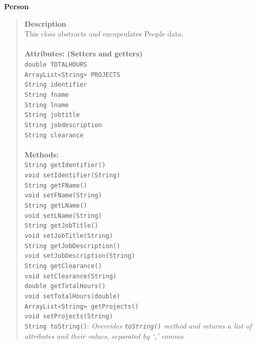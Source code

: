 \documentclass[12pt]{article}
\begin{document}
{\bf Person}
\begin{quote}
{\bf Description}\\
This class abstracts and encapsulates People data.\\\\
{\bf Attributes: (Setters and getters)}\\
\texttt{double TOTALHOURS}\\
\texttt{ArrayList<String> PROJECTS}\\
\texttt{String identifier}\\
\texttt{String fname}\\
\texttt{String lname}\\
\texttt{String jobtitle}\\
\texttt{String jobdescription}\\
\texttt{String clearance}\\\\
{\bf Methods:}\\
\texttt{String getIdentifier() }\\
\texttt{void setIdentifier(String) }\\
\texttt{String getFName() }\\
\texttt{void setFName(String) }\\
\texttt{String getLName() }\\
\texttt{void setLName(String) }\\
\texttt{String getJobTitle() }\\
\texttt{void setJobTitle(String) }\\
\texttt{String getJobDescription() }\\
\texttt{void setJobDescription(String) }\\
\texttt{String  getClearance() }\\
\texttt{void setClearance(String) }\\
\texttt{double getTotalHours() }\\
\texttt{void setTotalHours(double)  }\\
\texttt{ArrayList<String> getProjects()  }\\
\texttt{void setProjects(String) }\\
\texttt{String toString()}: \emph{Overrides \texttt{toString()} method and returns a list of attributes and their values, separated by `,' comma}
\end{quote}

\pagebreak
 
\end{document}
